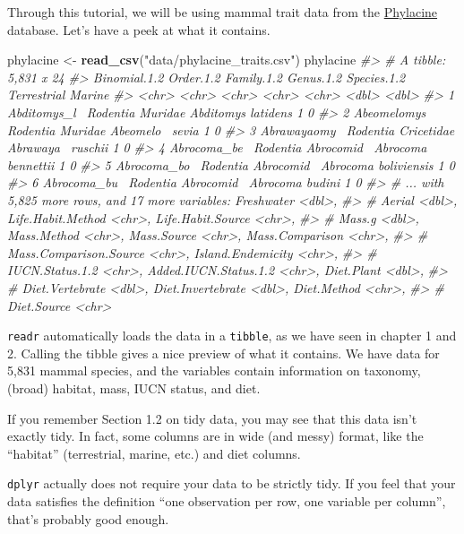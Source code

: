 \documentclass[]{book}
\newenvironment{Shaded}{}{}
\newcommand{\CommentTok}[1]{\textcolor[rgb]{0.38,0.63,0.69}{\textit{#1}}}
\newcommand{\KeywordTok}[1]{\textcolor[rgb]{0.00,0.44,0.13}{\textbf{#1}}}
\newcommand{\NormalTok}[1]{#1}
\newcommand{\StringTok}[1]{\textcolor[rgb]{0.25,0.44,0.63}{#1}}
\begin{document}
Through this tutorial, we will be using mammal trait data from the \href{https://megapast2future.github.io/PHYLACINE_1.2/}{Phylacine} database.
Let's have a peek at what it contains.

\begin{Shaded}
\begin{Highlighting}[]
\NormalTok{phylacine <-}\StringTok{ }\KeywordTok{read_csv}\NormalTok{(}\StringTok{"data/phylacine_traits.csv"}\NormalTok{)}
\NormalTok{phylacine}
\CommentTok{#> # A tibble: 5,831 x 24}
\CommentTok{#>   Binomial.1.2 Order.1.2 Family.1.2 Genus.1.2 Species.1.2 Terrestrial Marine}
\CommentTok{#>   <chr>        <chr>     <chr>      <chr>     <chr>             <dbl>  <dbl>}
\CommentTok{#> 1 Abditomys_l~ Rodentia  Muridae    Abditomys latidens              1      0}
\CommentTok{#> 2 Abeomelomys~ Rodentia  Muridae    Abeomelo~ sevia                 1      0}
\CommentTok{#> 3 Abrawayaomy~ Rodentia  Cricetidae Abrawaya~ ruschii               1      0}
\CommentTok{#> 4 Abrocoma_be~ Rodentia  Abrocomid~ Abrocoma  bennettii             1      0}
\CommentTok{#> 5 Abrocoma_bo~ Rodentia  Abrocomid~ Abrocoma  boliviensis           1      0}
\CommentTok{#> 6 Abrocoma_bu~ Rodentia  Abrocomid~ Abrocoma  budini                1      0}
\CommentTok{#> # ... with 5,825 more rows, and 17 more variables: Freshwater <dbl>,}
\CommentTok{#> #   Aerial <dbl>, Life.Habit.Method <chr>, Life.Habit.Source <chr>,}
\CommentTok{#> #   Mass.g <dbl>, Mass.Method <chr>, Mass.Source <chr>, Mass.Comparison <chr>,}
\CommentTok{#> #   Mass.Comparison.Source <chr>, Island.Endemicity <chr>,}
\CommentTok{#> #   IUCN.Status.1.2 <chr>, Added.IUCN.Status.1.2 <chr>, Diet.Plant <dbl>,}
\CommentTok{#> #   Diet.Vertebrate <dbl>, Diet.Invertebrate <dbl>, Diet.Method <chr>,}
\CommentTok{#> #   Diet.Source <chr>}
\end{Highlighting}
\end{Shaded}

\texttt{readr} automatically loads the data in a \texttt{tibble}, as we have seen in chapter
1 and 2. Calling the tibble gives a nice preview of what it contains. We have
data for 5,831 mammal species, and the variables contain information on taxonomy,
(broad) habitat, mass, IUCN status, and diet.

If you remember Section 1.2 on tidy data, you may see that this data isn't
exactly tidy. In fact, some columns are in wide (and messy) format, like the
``habitat'' (terrestrial, marine, etc.) and diet columns.

\texttt{dplyr} actually does not require your data to be strictly tidy. If you feel that your
data satisfies the definition ``one observation per row, one variable per column'',
that's probably good enough.
\end{document}
